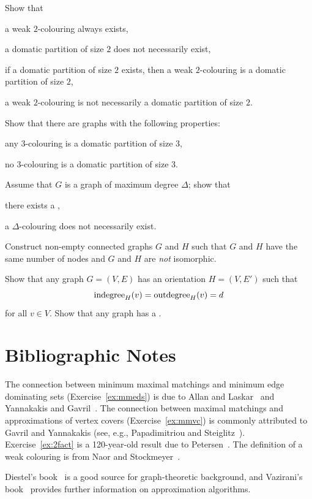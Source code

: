 \begin{ex}
    Show that
    \begin{subex}
        \item a weak $2$-colouring always exists,
        \item a domatic partition of size $2$ does not necessarily exist,
        \item if a domatic partition of size $2$ exists, then a weak $2$-colouring is a domatic partition of size $2$,
        \item a weak $2$-colouring is not necessarily a domatic partition of size $2$.
    \end{subex}
    Show that there are  graphs with the following properties:
    \begin{subex}[resume]
        \item any $3$-colouring is a domatic partition of size $3$,
        \item no $3$-colouring is a domatic partition of size $3$.
    \end{subex}
    Assume that $G$ is a graph of maximum degree $\Delta$; show that
    \begin{subex}[resume]
        \item there exists a \Dpocol,
        \item a $\Delta$-colouring does not necessarily exist.
    \end{subex}
\end{ex}

\begin{ex}[isomorphism]
    Construct non-empty  connected graphs $G$ and $H$ such that $G$ and $H$ have the same number of nodes and $G$ and $H$ are \emph{not} isomorphic.
\end{ex}

\begin{exs}[Petersen 1891]\label{ex:2fact}
    Show that any  graph $G = (V,E)$ has an orientation $H = (V,E')$ such that \[\operatorname{indegree}_H(v) = \operatorname{outdegree}_H(v) = d\] for all $v \in V$. Show that any  graph has a .
\end{exs}


\section{Bibliographic Notes}

The connection between minimum maximal matchings and minimum edge dominating sets (Exercise~\ref{ex:mmeds}) is due to Allan and Laskar~\cite{allan78domination} and Yannakakis and Gavril~\cite{yannakakis80edge}. The connection between maximal matchings and approximations of vertex covers (Exercise~\ref{ex:mmvc}) is commonly attributed to Gavril and Yannakakis (see, e.g., Papadimitriou and Steiglitz~\cite{papadimitriou98combinatorial}). Exercise~\ref{ex:2fact} is a 120-year-old result due to Petersen~\cite{petersen1891dietheorie}. The definition of a weak colouring is from Naor and Stockmeyer~\cite{naor95what}.

Diestel's book~\cite{diestel05graph} is a good source for graph-theoretic background, and Vazirani's book~\cite{vazirani01approximation} provides further information on approximation algorithms.
